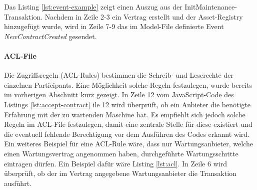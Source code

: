 Das Listing \ref{lst:event-example} zeigt einen Auszug aus der InitMaintenance-Transaktion. Nachdem in Zeile 2-3 ein Vertrag erstellt und der Asset-Registry hinzugefügt wurde, wird in Zeile 7-9 das im Model-File definierte Event \textit{NewContractCreated} gesendet.


\paragraph{ACL-File}
Die Zugriffsregeln (ACL-Rules) bestimmen die Schreib- und Leserechte der einzelnen Participants. Eine Möglichkeit solche Regeln festzulegen, wurde bereits im vorherigen Abschnitt kurz gezeigt. In Zeile 12 vom JavaScript-Code des Listings \ref{lst:accept-contract} ile 12 wird überprüft, ob ein Anbieter die benötigte Erfahrung mit der zu wartenden Maschine hat. Es empfiehlt sich jedoch solche Regeln im ACL-File festzulegen, damit eine zentrale Stelle für diese existiert und die eventuell fehlende Berechtigung vor dem Ausführen des Codes erkannt wird. Ein weiteres Beispiel für eine ACL-Rule wäre, dass nur Wartungsanbieter, welche einen Wartungsvertrag angenommen haben, durchgeführte Wartungsschritte eintragen dürfen. Ein Beispiel dafür wäre Listing \ref{lst:acl}. In Zeile 6 wird überprüft, ob der im Vertrag angegebene Wartungsanbieter die Transaktion ausführt.



